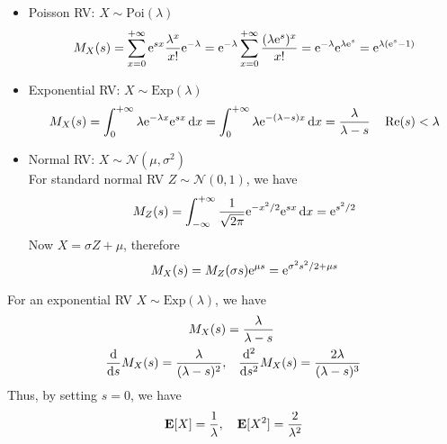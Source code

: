 \begin{example}
    \begin{itemize}
        \item Poisson RV: $X \sim \text{Poi}(\lambda)$
        \begin{equation}
            M_{X}(s) = \sum_{x=0}^{+\infty} \mathrm{e}^{sx} \frac{\lambda^x}{x!} \mathrm{e}^{-\lambda} = \mathrm{e}^{-\lambda} \sum_{x=0}^{+\infty} \frac{(\lambda \mathrm{e}^{s})^x}{x!} = \mathrm{e}^{-\lambda} \mathrm{e}^{\lambda \mathrm{e}^{s}} = \mathrm{e}^{\lambda(\mathrm{e}^{s} - 1)}
        \end{equation}
        \item Exponential RV: $X \sim \text{Exp}(\lambda)$
        \begin{equation}
            M_{X}(s) = \int_{0}^{+\infty} \lambda \mathrm{e}^{-\lambda x} \mathrm{e}^{sx} \dd{x} = \int_{0}^{+\infty} \lambda \mathrm{e}^{-(\lambda - s)x} \dd{x} = \frac{\lambda}{\lambda - s} \quad \Re(s) < \lambda
        \end{equation}
        \item Normal RV: $X \sim \mathcal{N}(\mu, \sigma^2)$ \\ 
        For standard normal RV $Z \sim \mathcal{N}(0, 1)$, we have
        \begin{equation}
            M_{Z}(s) = \int_{-\infty}^{+\infty} \frac{1}{\sqrt{2\pi}} \mathrm{e}^{-x^2/2} \mathrm{e}^{sx} \dd{x} = \mathrm{e}^{s^2/2} 
        \end{equation}
        Now $X = \sigma Z + \mu$, therefore
        \begin{equation}
            M_{X}(s) = M_{Z}(\sigma s) \mathrm{e}^{\mu s} = \mathrm{e}^{\sigma^2 s^2/2+ \mu s}
        \end{equation}
    \end{itemize}
\end{example}

\begin{example}
    For an exponential RV $X \sim \text{Exp}(\lambda)$, we have
    \begin{equation}
    \begin{aligned}
        M_{X}(s) &= \frac{\lambda}{\lambda - s} \\ 
        \dv{s} M_{X}(s) = \frac{\lambda}{(\lambda - s)^2}, &\quad \dv[2]{s} M_{X}(s) = \frac{2\lambda}{(\lambda - s)^3}
    \end{aligned}
    \end{equation}
    Thus, by setting $s = 0$, we have
    \begin{equation}
        \mathbf{E}[X] = \frac{1}{\lambda}, \quad \mathbf{E}[X^2] = \frac{2}{\lambda^2}
    \end{equation}
\end{example}


